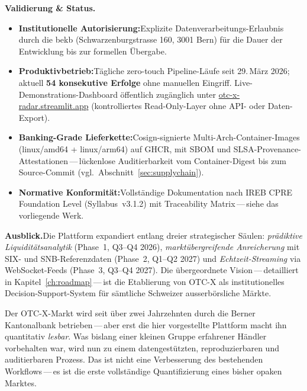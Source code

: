 \documentclass[11pt, a4paper, oneside, openany]{report}
\begin{document}
\noindent\textbf{\sffamily\textcolor{SwissRed}{Validierung \& Status.}}
\begin{itemize}[leftmargin=1.4em, itemsep=2pt, topsep=2pt]
  \item \textbf{Institutionelle Autorisierung:}\;Explizite Datenverarbeitungs-Erlaubnis durch die \gls{bekb} (Schwarzenburgstrasse 160, 3001 Bern) für die Dauer der Entwicklung bis zur formellen Übergabe.
  \item \textbf{Produktivbetrieb:}\;Tägliche zero-touch Pipeline-Läufe seit 29.\,März 2026; aktuell \textbf{54 konsekutive Erfolge} ohne manuellen Eingriff. Live-Demonstrations-Dashboard öffentlich zugänglich unter \href{https://otc-x-radar.streamlit.app}{otc-x-radar.streamlit.app} (kontrolliertes Read-Only-Layer ohne API- oder Daten-Export).
  \item \textbf{Banking-Grade Lieferkette:}\;Cosign-signierte Multi-Arch-Container-Images (linux/amd64 + linux/arm64) auf GHCR, mit SBOM und SLSA-Provenance-Attestationen\,---\,lückenlose Auditierbarkeit vom Container-Digest bis zum Source-Commit (vgl.~Abschnitt~\ref{sec:supplychain}).
  \item \textbf{Normative Konformität:}\;Vollständige Dokumentation nach IREB CPRE Foundation Level (Syllabus~v3.1.2) mit Traceability Matrix\,---\,siehe das vorliegende Werk.
\end{itemize}

\vspace{0.4cm}

\noindent\textbf{\sffamily\textcolor{SwissRed}{Ausblick.}}\;Die Plattform expandiert entlang dreier strategischer Säulen: \textit{prädiktive Liquiditätsanalytik} (Phase~1, Q3--Q4 2026), \textit{marktübergreifende Anreicherung} mit SIX- und SNB-Referenzdaten (Phase~2, Q1--Q2 2027) und \textit{Echtzeit-Streaming} via WebSocket-Feeds (Phase~3, Q3--Q4 2027). Die übergeordnete Vision\,---\,detailliert in Kapitel~\ref{ch:roadmap}\,---\,ist die Etablierung von OTC-X als institutionelles Decision-Support-System für sämtliche Schweizer ausserbörsliche Märkte.

\vspace{0.55cm}

\begin{insightbox}
Der OTC-X-Markt wird seit über zwei Jahrzehnten durch die Berner Kantonalbank betrieben\,---\,aber erst die hier vorgestellte Plattform macht ihn quantitativ \emph{lesbar}. Was bislang einer kleinen Gruppe erfahrener Händler vorbehalten war, wird nun zu einem datengestützten, reproduzierbaren und auditierbaren Prozess. Das ist nicht eine Verbesserung des bestehenden Workflows\,---\,es ist die erste vollständige Quantifizierung eines bisher opaken Marktes.
\end{insightbox}
\end{document}
